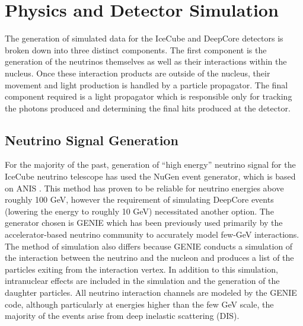 \documentclass[../Main.tex]{subfiles}
\begin{document}
       {}       {}
    {}    {}
 {} {}


\graphicspath{{figures/}{PhysicsDetectorSimulation/figures/}}


\section{Physics and Detector Simulation}\label{sec:PhysDetSim}

The generation of simulated data for the IceCube and DeepCore detectors is broken down into three distinct components.  The first component is the generation of the neutrinos themselves as well as their interactions within the nucleus.  Once these interaction products are outside of the nucleus, their movement and light production is handled by a particle propagator.  The final component required is a light propagator which is responsible only for tracking the photons produced and determining the final hits produced at the detector.

\subsection{Neutrino Signal Generation}\label{sec:neutSignal}

For the majority of the past, generation of ``high energy'' neutrino signal for the IceCube neutrino telescope has used the NuGen event generator, which is based on ANIS \cite{Gazizov:2004va}.  This method has proven to be reliable for neutrino energies above roughly 100 GeV, however the requirement of simulating DeepCore events (lowering the energy to roughly 10 GeV) necessitated another option.  The generator chosen is GENIE \cite{Andreopoulos:2009rq} which has been previously used primarily by the accelerator-based neutrino community to accurately model few-GeV interactions.  The method of simulation also differs because GENIE conducts a simulation of the interaction between the neutrino and the nucleon and produces a list of the particles exiting from the interaction vertex.  In addition to this simulation, intranuclear effects are included in the simulation and the generation of the daughter particles.  All neutrino interaction channels are modeled by the GENIE code, although particularly at energies higher than the few GeV scale, the majority of the events arise from deep inelastic scattering (DIS).
\end{document}

